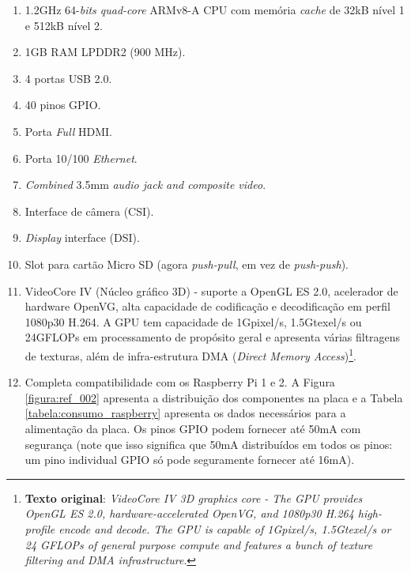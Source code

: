 \begin{enumerate}
	\item 1.2GHz 64-\textit{bits quad-core} ARMv8-A CPU com memória \textit{cache} de 32kB nível 1 e 512kB nível 2.
		
	\item 1GB RAM LPDDR2 (900 MHz).
		
	\item 4 portas USB 2.0.
		
	\item 40 pinos GPIO.
		
	\item Porta \textit{Full} HDMI.
		
	\item Porta 10/100 \textit{Ethernet}.
		
	\item \textit{Combined} 3.5mm \textit{audio jack and composite video}.
		
	\item Interface de câmera (CSI).	
	
	\item \textit{Display} interface (DSI).
		
	\item Slot para cartão Micro SD (agora \textit{push-pull}, em vez de \textit{push-push}).
		
	\item VideoCore IV (Núcleo gráfico 3D) - suporte a OpenGL ES 2.0, acelerador de hardware OpenVG, alta capacidade de codificação e decodificação em perfil 1080p30 H.264. A GPU tem capacidade de 1Gpixel/s, 1.5Gtexel/s ou 24GFLOPs em processamento de propósito geral e apresenta várias filtragens de texturas,  além de infra-estrutura DMA (\textit{Direct Memory Access})\footnote{\textbf{Texto original}: \textit{VideoCore IV 3D graphics core - The GPU provides OpenGL ES 2.0, hardware-accelerated OpenVG, and 1080p30 H.264 high-profile encode and decode. The GPU is capable of 1Gpixel/s, 1.5Gtexel/s or 24 GFLOPs of general purpose compute and features a bunch of texture filtering and DMA infrastructure}.}.
	 	
	\item Completa compatibilidade com os Raspberry Pi 1 e 2. A Figura \ref{figura:ref_002} apresenta a distribuição dos componentes na placa e a Tabela \ref{tabela:consumo_raspberry} apresenta os dados necessários para a alimentação da placa. Os pinos GPIO podem fornecer até 50mA com segurança (note que isso significa que 50mA distribuídos em todos os pinos: um pino individual GPIO só pode seguramente fornecer até 16mA).
\end{enumerate}	

